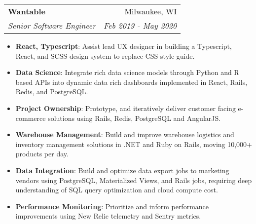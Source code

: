 \documentclass[letterpaper,11pt]{article}
\makeatletter
\newcommand{\resumeItem}[2]{
  \item\small{
    \textbf{#1}{: #2 \vspace{-2pt}}
  }
}
\newcommand{\resumeSubheading}[4]{
  \vspace{-1pt}\item
    \begin{tabular*}{0.97\textwidth}{l@{\extracolsep{\fill}}r}
      \textbf{#1} & #2 \\
      \textit{\small#3} & \textit{\small #4} \\
    \end{tabular*}\vspace{-5pt}
}
\newcommand{\resumeItemListStart}{\begin{itemize}}
\newcommand{\resumeItemListEnd}{\end{itemize}\vspace{-5pt}}
\makeatother
\begin{document}
    \resumeSubheading
      {Wantable}{Milwaukee, WI}
      {Senior Software Engineer}{Feb 2019 - May 2020}
      \resumeItemListStart
        \resumeItem{React, Typescript}
          {Assist lead UX designer in building a Typescript, React, and SCSS design system to replace CSS style guide.}
        \resumeItem{Data Science}
          {Integrate rich data science models through Python and R based APIs into dynamic data rich dashboards implemented in React, Rails, Redis, and PostgreSQL.}
        \resumeItem{Project Ownership}
          {Prototype, and iteratively deliver customer facing e-commerce solutions using Rails, Redis, PostgreSQL and AngularJS.}
        \resumeItem{Warehouse Management}
          {Build and improve warehouse logistics and inventory management solutions in .NET and Ruby on Rails, moving 10,000+ products per day.}
        \resumeItem{Data Integration}
          {Build and optimize data export jobs to marketing vendors using PostgreSQL, Materialized Views, and Rails jobs, requiring deep understanding of SQL query optimization and cloud compute cost.}
        \resumeItem{Performance Monitoring}
          {Prioritize and inform performance improvements using New Relic telemetry and Sentry metrics.}


      \resumeItemListEnd
\end{document}

